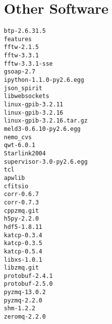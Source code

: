 \documentclass[11pt]{article}
\begin{document}
\section{Other Software}
\label{app:hand}

\begin{verbatim}
btp-2.6.31.5
features
fftw-2.1.5
fftw-3.3.1
fftw-3.3.1-sse
gsoap-2.7
ipython-1.1.0-py2.6.egg
json_spirit
libwebsockets
linux-gpib-3.2.11
linux-gpib-3.2.16
linux-gpib-3.2.16.tar.gz
meld3-0.6.10-py2.6.egg
nemo_cvs
qwt-6.0.1
Starlink2004
supervisor-3.0-py2.6.egg
tcl
apwlib
cfitsio
corr-0.6.7
corr-0.7.3
cppzmq.git
h5py-2.2.0
hdf5-1.8.11
katcp-0.3.4
katcp-0.3.5
katcp-0.5.4
libxs-1.0.1
libzmq.git
protobuf-2.4.1
protobuf-2.5.0
pyzmq-13.0.2
pyzmq-2.2.0
shm-1.2.2
zeromq-2.2.0

\end{verbatim}
\end{document}
